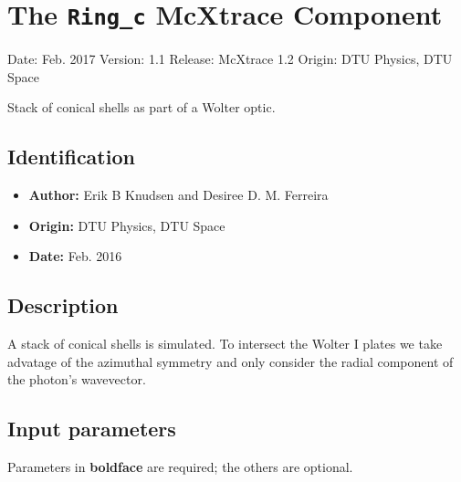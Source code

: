 \section{The \texttt{Ring\_c} McXtrace Component}
Date: Feb. 2017
Version: 1.1
Release: McXtrace 1.2
Origin: DTU Physics, DTU Space

Stack of conical shells as part of a Wolter optic.

\subsection*{Identification}
\begin{itemize}
  \item \textbf{Author:} Erik B Knudsen and Desiree D. M. Ferreira
  \item \textbf{Origin:} DTU Physics, DTU Space
  \item \textbf{Date:} Feb. 2016
\end{itemize}

\subsection*{Description}
A stack of conical shells is simulated. To intersect the Wolter I plates we take advatage of the azimuthal symmetry and only consider the radial component of the photon's wavevector.

\subsection*{Input parameters}
Parameters in \textbf{boldface} are required; the others are optional.

